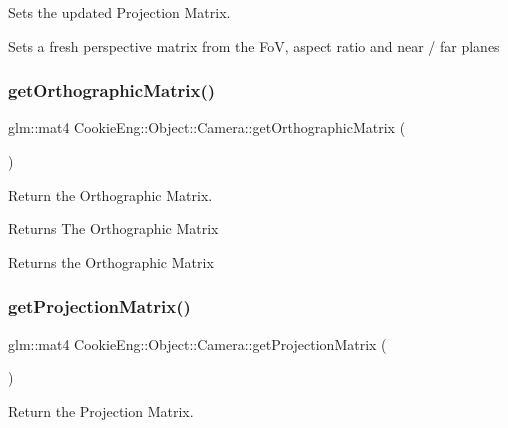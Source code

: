 Sets the updated Projection Matrix. 

Sets a fresh perspective matrix from the FoV, aspect ratio and near / far planes \mbox{\label{class_cookie_eng_1_1_object_1_1_camera_a97d3643a31849d86ad74137417d229df}} 
\subsubsection{\texorpdfstring{get\+Orthographic\+Matrix()}{getOrthographicMatrix()}}
{\footnotesize\ttfamily glm\+::mat4 Cookie\+Eng\+::\+Object\+::\+Camera\+::get\+Orthographic\+Matrix (\begin{DoxyParamCaption}{ }\end{DoxyParamCaption})\hspace{0.3cm}{\ttfamily [inline]}}



Return the Orthographic Matrix. 

\begin{DoxyReturn}{Returns}
The Orthographic Matrix
\end{DoxyReturn}
Returns the Orthographic Matrix \mbox{\label{class_cookie_eng_1_1_object_1_1_camera_afa69ef269138610423e2dc8707720500}} 
\subsubsection{\texorpdfstring{get\+Projection\+Matrix()}{getProjectionMatrix()}}
{\footnotesize\ttfamily glm\+::mat4 Cookie\+Eng\+::\+Object\+::\+Camera\+::get\+Projection\+Matrix (\begin{DoxyParamCaption}{ }\end{DoxyParamCaption})\hspace{0.3cm}{\ttfamily [inline]}}



Return the Projection Matrix. 

